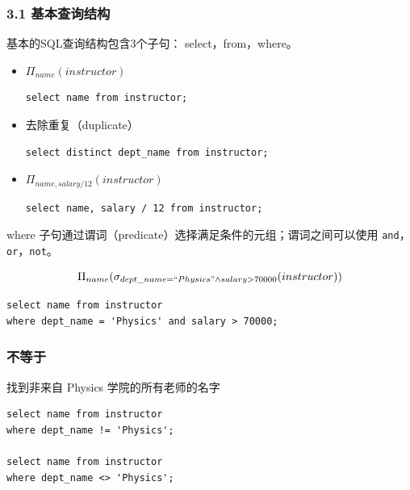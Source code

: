 \documentclass[aspectratio=169, 14pt]{beamer}
\begin{document}
\begin{frame}[fragile]
	\frametitle{3.1 基本查询结构}
	基本的SQL查询结构包含3个子句： \alert{select}，\alert{from}，\alert{where}。

	\begin{itemize}
		\item<1-> \(\Pi_{name}(instructor)\)
		      \begin{verbatim}
select name from instructor;
    \end{verbatim}
		\item<2-> 去除重复（duplicate）
		      \begin{verbatim}
select distinct dept_name from instructor;
\end{verbatim}
		\item<3-> \(\Pi_{name, salary/12}(instructor)\)
		      \begin{verbatim}
select name, salary / 12 from instructor;
\end{verbatim}
	\end{itemize}
\end{frame}

\begin{frame}[fragile]
	\alert{where} 子句通过谓词（predicate）选择满足条件的元组；谓词之间可以使用 \texttt{and}，\texttt{or}，\texttt{not}。

	\[\Pi_{name}(\sigma_{dept\_name=``Physics" \land salary > 70000}(instructor))\]
	\begin{verbatim}
select name from instructor 
where dept_name = 'Physics' and salary > 70000;
    \end{verbatim}
	\pause
\end{frame}

\begin{frame}[fragile]
	\frametitle{不等于}
	找到非来自 Physics 学院的所有老师的名字

	\begin{verbatim}
select name from instructor 
where dept_name != 'Physics';

select name from instructor 
where dept_name <> 'Physics';
\end{verbatim}


\end{frame}
\end{document}
